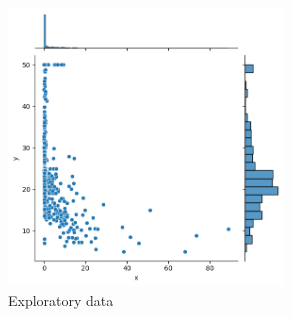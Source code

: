 \documentclass{article}
\begin{document}
\begin{figure}[h]
  \centering
  \includegraphics[width=0.65\textwidth]{data1_plot1.png}
  \caption{Exploratory data}
  \label{fig:ejemplo}
\end{figure}
\end{document}

